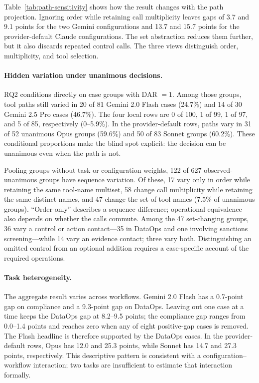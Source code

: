 \documentclass{article}
\begin{document}
Table~\ref{tab:path-sensitivity} shows how the result changes with the path
projection.  Ignoring order while retaining call
multiplicity leaves gaps of 3.7 and 9.1 points for the two Gemini configurations
and 13.7 and 15.7 points for the provider-default Claude configurations.  The
set abstraction reduces them further, but it also discards repeated control
calls.  The three views distinguish order, multiplicity, and tool selection.

\paragraph{Hidden variation under unanimous decisions.}
RQ2 conditions directly on case groups with DAR $=1$.  Among those groups,
tool paths still varied in 20 of 81 Gemini 2.0 Flash cases (24.7\%) and 14 of
30 Gemini 2.5 Pro cases (46.7\%).
The four local rows are 0 of 100, 1 of 99, 1 of 97, and 5 of 85, respectively
(0--5.9\%).  In the provider-default rows, paths vary in 31
of 52 unanimous Opus groups (59.6\%) and 50 of 83 Sonnet groups (60.2\%).
These conditional proportions make the blind spot explicit: the decision can
be unanimous even when the path is not.

Pooling groups without task or configuration weights, 122 of 627
observed-unanimous groups have sequence
variation.  Of these, 17 vary only in order while retaining the same tool-name
multiset, 58 change call multiplicity while retaining the same distinct names,
and 47 change the set of tool names (7.5\% of unanimous groups).  ``Order-only''
describes a sequence difference; operational equivalence also depends on
whether the calls commute.  Among the 47
set-changing groups, 36 vary a control or action contact---35 in DataOps and
one involving sanctions screening---while 14 vary an evidence contact; three
vary both.  Distinguishing an omitted control from an optional addition
requires a case-specific account of the required operations.

\paragraph{Task heterogeneity.}
The aggregate result varies across workflows.  Gemini 2.0 Flash has a
0.7-point gap on compliance and a 9.3-point gap on DataOps.  Leaving out one
case at a time keeps the DataOps gap at 8.2--9.5 points; the compliance gap
ranges from 0.0--1.4 points and reaches zero when any of eight positive-gap
cases is removed.  The Flash headline is therefore supported by the DataOps
cases.  In the provider-default rows,
Opus has 12.0 and 25.3 points, while Sonnet
has 14.7 and 27.3 points, respectively.  This descriptive pattern is consistent
with a configuration--workflow interaction; two tasks are insufficient to
estimate that interaction formally.
\end{document}
